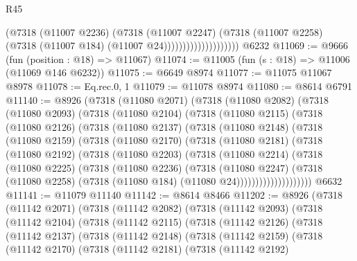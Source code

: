 \begin{lexlean}{R45}
\begin{coremodule}
{                                  (@7318
                                    (@11007 @2236)
                                    (@7318
                                      (@11007 @2247)
                                      (@7318
                                        (@11007 @2258)
                                        (@7318 (@11007 @184) (@11007 @24))))))))))))))))))))
    @6232
@11069 := @9666 (fun (position : @18) => @11067)
@11074 := @11005 (fun (s : @18) => @11006 (@11069 @146 @6232))
@11075 := @6649 @8974
@11077 := @11075 @11067 @8978
@11078 := Eq.rec.{0, 1}
@11079 := @11078 @8974
@11080 := @8614 @6791
@11140 := @8926
    (@7318
      (@11080 @2071)
      (@7318
        (@11080 @2082)
        (@7318
          (@11080 @2093)
          (@7318
            (@11080 @2104)
            (@7318
              (@11080 @2115)
              (@7318
                (@11080 @2126)
                (@7318
                  (@11080 @2137)
                  (@7318
                    (@11080 @2148)
                    (@7318
                      (@11080 @2159)
                      (@7318
                        (@11080 @2170)
                        (@7318
                          (@11080 @2181)
                          (@7318
                            (@11080 @2192)
                            (@7318
                              (@11080 @2203)
                              (@7318
                                (@11080 @2214)
                                (@7318
                                  (@11080 @2225)
                                  (@7318
                                    (@11080 @2236)
                                    (@7318
                                      (@11080 @2247)
                                      (@7318
                                        (@11080 @2258)
                                        (@7318 (@11080 @184) (@11080 @24))))))))))))))))))))
    @6632
@11141 := @11079 @11140
@11142 := @8614 @8466
@11202 := @8926
    (@7318
      (@11142 @2071)
      (@7318
        (@11142 @2082)
        (@7318
          (@11142 @2093)
          (@7318
            (@11142 @2104)
            (@7318
              (@11142 @2115)
              (@7318
                (@11142 @2126)
                (@7318
                  (@11142 @2137)
                  (@7318
                    (@11142 @2148)
                    (@7318
                      (@11142 @2159)
                      (@7318
                        (@11142 @2170)
                        (@7318
                          (@11142 @2181)
                          (@7318
                            (@11142 @2192)
}
\end{coremodule}
\end{lexlean}
